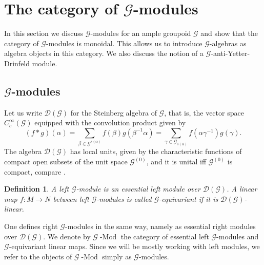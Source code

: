 \documentclass{amsart}
\newtheorem{dfn}[thm]{Definition}
\newcommand{\G}{\mathcal{G}}
\newcommand{\DG}{\mathcal{D}(\mathcal{G})}
\newcommand{\ccinfty}{C_c^\infty}
\begin{document}
\section{The category of $ \G $-modules} \label{section:dgmodules}

In this section we discuss $ \G $-modules for an ample groupoid $ \G $ and show that the category of $ \G $-modules is monoidal. This allows us to introduce $ \G $-algebras as algebra objects in this category. We also discuss the notion of a $ \G $-anti-Yetter-Drinfeld module. 

\subsection{$ \G $-modules}

Let us write $ \DG $ for the Steinberg algebra of $ \G $, that is, the vector space $ \ccinfty(\G) $ equipped with the convolution product given by 
$$
(f * g)(\alpha) = \sum_{\beta\in\G^{r(\alpha)}} f(\beta) g(\beta^{-1}\alpha)
= \sum_{\gamma\in\G_{s(\alpha)}} f(\alpha \gamma^{-1}) g(\gamma). 
$$
The algebra $ \DG $ has local units, given by the characteristic functions of compact open subsets of the unit space $ \G^{(0)} $, and it is unital iff $ \G^{(0)} $ is compact, compare \cite{STEINBERG_discreteinversesemigroup}. 

\begin{dfn}
A left $ \G $-module is an essential left module over $ \DG $. A linear map $ f: M \rightarrow N $ between left $ \G $-modules is called $ \G $-equivariant if it is $ \DG $-linear. 
\end{dfn}

One defines right $ \G $-modules in the same way, namely as essential right modules over $ \DG $. 
We denote by $ \G \operatorname{-Mod} $ the category of essential left $ \G $-modules and $ \G $-equivariant linear maps. Since we will be mostly working with left modules, we refer to the objects of $ \G \operatorname{-Mod} $ simply as $ \G $-modules. 
\end{document}
